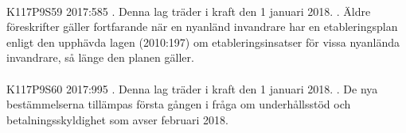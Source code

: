 \documentclass[a4paper,notitlepage,openany,10pt]{book}
\begin{document}
\paragraph*{}
{\tiny K117P9S59}
2017:585
. Denna lag träder i kraft den 1 januari 2018.
. Äldre föreskrifter gäller fortfarande när en nyanländ invandrare har en etableringsplan enligt den upphävda lagen (2010:197) om etableringsinsatser för vissa nyanlända invandrare, så länge den planen gäller.
\paragraph*{}
{\tiny K117P9S60}
2017:995
. Denna lag träder i kraft den 1 januari 2018.
. De nya bestämmelserna tillämpas första gången i fråga om underhållsstöd och betalningsskyldighet som avser februari 2018.
\end{document}
